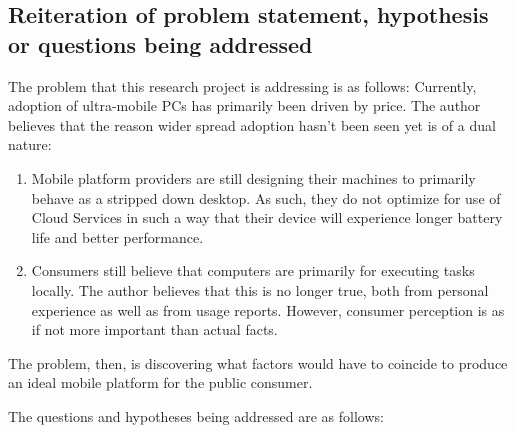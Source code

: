 \documentclass[12pt,oneside,letterpaper]{article}
\begin{document}
\subsection{Reiteration of problem statement, hypothesis or questions being addressed}

The problem that this research project is addressing is as follows: Currently,
adoption of ultra-mobile PCs has primarily been driven by price.  The author
believes that the reason wider spread adoption hasn't been seen yet is of a dual
nature:

\begin{enumerate}

\item Mobile platform providers are still designing their machines to primarily
  behave as a stripped down desktop.  As such, they do not optimize for use of
  Cloud Services in such a way that their device will experience longer battery
  life and better performance.

\item Consumers still believe that computers are primarily for executing tasks
  locally.  The author believes that this is no longer true, both from personal
  experience as well as from usage reports.  However, consumer perception is as
  if not more important than actual facts.

\end{enumerate}

The problem, then, is discovering what factors would have to coincide to produce
an ideal mobile platform for the public consumer.

The questions and hypotheses being addressed are as follows:
\end{document}
